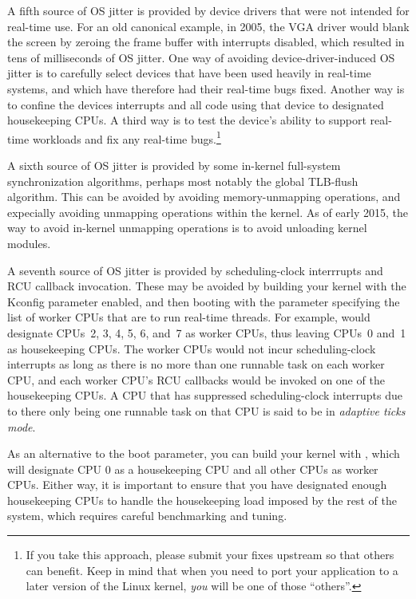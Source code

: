 A fifth source of OS jitter is provided by device drivers that were
not intended for real-time use.
For an old canonical example, in 2005, the VGA driver would blank
the screen by zeroing the frame buffer with interrupts disabled,
which resulted in tens of milliseconds of OS jitter.
One way of avoiding device-driver-induced OS jitter is to carefully
select devices that have been used heavily in real-time systems,
and which have therefore had their real-time bugs fixed.
Another way is to confine the devices interrupts and all code using
that device to designated housekeeping CPUs.
A third way is to test the device's ability to support real-time
workloads and fix any real-time bugs.\footnote{
	If you take this approach, please submit your fixes upstream
	so that others can benefit.
	Keep in mind that when you need to port your application to
	a later version of the Linux kernel, \emph{you} will be one of those
	``others''.}

A sixth source of OS jitter is provided by some in-kernel
full-system synchronization algorithms, perhaps most notably
the global TLB-flush algorithm.
This can be avoided by avoiding memory-unmapping operations, and expecially
avoiding unmapping operations within the kernel.
As of early 2015, the way to avoid in-kernel
unmapping operations is to avoid unloading kernel modules.

A seventh source of OS jitter is provided by
scheduling-clock interrrupts and RCU callback invocation.
These may be avoided by building your kernel with the
 Kconfig parameter enabled, and then booting
with the  parameter specifying the list of
worker CPUs that are to run real-time threads.
For example,  would designate CPUs~2, 3, 4, 5, 6, and~7
as worker CPUs, thus leaving CPUs~0 and~1 as housekeeping CPUs.
The worker CPUs would not incur scheduling-clock interrupts as long
as there is no more than one runnable task on each worker CPU,
and each worker CPU's RCU callbacks would be invoked on one of the
housekeeping CPUs.
A CPU that has suppressed scheduling-clock interrupts due to there
only being one runnable task on that CPU is said to be in
\emph{adaptive ticks mode}.

As an alternative to the  boot parameter, you can build
your kernel with , which will designate CPU 0 as
a housekeeping CPU and all other CPUs as worker CPUs.
Either way, it is important to ensure that you have designated enough
housekeeping CPUs to handle the housekeeping load imposed by the
rest of the system, which requires careful benchmarking and tuning.

